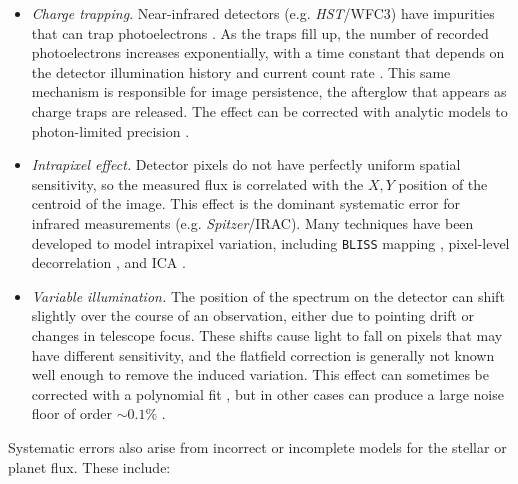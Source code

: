 \documentclass[graybox,natbib,nosecnum]{svmult}
\newcommand{\project}[1]{\textsl{#1}}
\newcommand{\HST}{\project{HST}}
\newcommand{\Spitzer}{\project{Spitzer}}
\begin{document}
\begin{itemize}
\item{\emph{Charge trapping}. Near-infrared detectors (e.g. \HST/WFC3) have impurities that can trap photoelectrons \citep{smith08}. As the traps fill up, the number of recorded photoelectrons increases exponentially, with a time constant that depends on the detector illumination history and current count rate \citep{zhou17}.  This same mechanism is responsible for image persistence, the afterglow that appears as charge traps are released. The effect can be corrected with analytic models to photon-limited precision \citep{deming13, line16}. 
}
\item{\emph{Intrapixel effect.} Detector pixels do not have perfectly uniform spatial sensitivity, so the measured flux is correlated with the $X, Y$ position of the centroid of the image. This effect is the dominant systematic error for infrared measurements (e.g. \Spitzer/IRAC). Many techniques have been developed to model intrapixel variation, including \texttt{BLISS} mapping \citep{stevenson12}, pixel-level decorrelation \citep{deming15}, and ICA \citep{morello15}.}
\item{\emph{Variable illumination.} The position of the spectrum on the detector can shift slightly over the course of an observation, either due to pointing drift or changes in telescope focus. These shifts cause light to fall on pixels that may have different sensitivity, and the flatfield correction is generally not known well enough to remove the induced variation. This effect can sometimes be corrected with a polynomial fit \citep[e.g. for HST/STIS observations;][]{sing11}, but in other cases can produce a large noise floor of order $\sim0.1\%$ \citep[as for the old HST instrument NICMOS;][]{gibson11}.}
\end{itemize}

Systematic errors also arise from incorrect or incomplete models for the stellar or planet flux. These include: 
\end{document}
